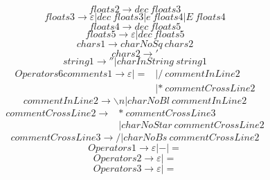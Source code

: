 \documentclass{article}
\begin{document}
\begin{equation}
	floats2 \rightarrow dec \ floats3
\end{equation}
\begin{equation}
	floats3 \rightarrow \varepsilon | dec \ floats3 | e \ floats4 | E \ floats4
\end{equation}
\begin{equation}
	floats4 \rightarrow dec \ floats5
\end{equation}
\begin{equation}
	floats5 \rightarrow \varepsilon | dec \ floats5
\end{equation}
\begin{equation}
	chars1 \rightarrow charNoSq \ chars2
\end{equation}
\begin{equation}
	chars2 \rightarrow '
\end{equation}
\begin{equation}
	string1 \rightarrow '' | charInString \ string1
\end{equation}
\begin{equation}
	\begin{aligned}
		Operators6comments1 \rightarrow \varepsilon | = & | / \ commentInLine2   \\
		                                                & |* \ commentCrossLine2
	\end{aligned}
\end{equation}
\begin{equation}
	commentInLine2 \rightarrow \backslash n | charNoBl \ commentInLine2
\end{equation}
\begin{equation}
	\begin{aligned}
		commentCrossLine2 \rightarrow & * \ commentCrossLine3            \\
		                              & | charNoStar \ commentCrossLine2
	\end{aligned}
\end{equation}
\begin{equation}
	commentCrossLine3 \rightarrow / | charNoBs \ commentCrossLine2
\end{equation}
\begin{equation}
	Operators1 \rightarrow \varepsilon | - | =
\end{equation}
\begin{equation}
	Operators2 \rightarrow \varepsilon | =
\end{equation}
\begin{equation}
	Operators3 \rightarrow \varepsilon | =
\end{equation}
\end{document}

